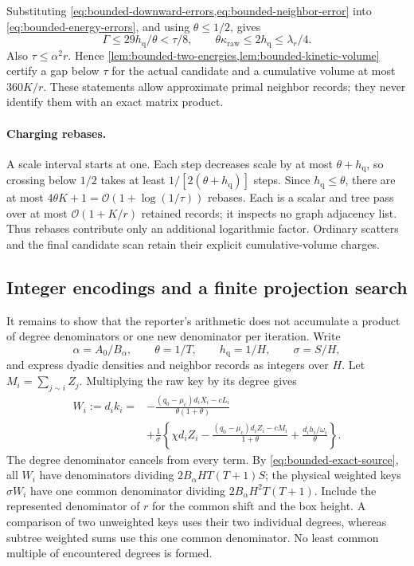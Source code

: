 Substituting \cref{eq:bounded-downward-errors,eq:bounded-neighbor-error}
into \cref{eq:bounded-energy-errors}, and using $\theta\leq1/2$, gives
\begin{equation}
 \Gamma\leq29h_{\mathrm{q}}/\theta<\tau/8,
 \qquad \theta\kappa_{\mathrm{raw}}\leq2h_{\mathrm{q}}\leq\lambda_r/4.
 \label{eq:bounded-certified-budgets}
\end{equation}
Also $\tau\leq\alpha^2r$. Hence
\cref{lem:bounded-two-energies,lem:bounded-kinetic-volume} certify a gap
below $\tau$ for the actual candidate and a cumulative volume at most
$360K/r$. These statements allow approximate primal neighbor records;
they never identify them with an exact matrix product.

\paragraph{Charging rebases.}
A scale interval starts at one. Each step decreases scale by at most
$\theta+h_{\mathrm{q}}$, so crossing below $1/2$ takes at least
$1/[2(\theta+h_{\mathrm{q}})]$ steps. Since $h_{\mathrm{q}}\leq\theta$,
there are at most $4\theta K+1=\mathcal{O}(1+\log(1/\tau))$ rebases.
Each is a scalar and tree pass over at most $\mathcal{O}(1+K/r)$ retained records;
it inspects no graph adjacency list. Thus rebases contribute only an
additional logarithmic factor. Ordinary scatters and the final candidate
scan retain their explicit cumulative-volume charges.

\subsection{Integer encodings and a finite projection search}

It remains to show that the reporter's arithmetic does not accumulate a
product of degree denominators or one new denominator per iteration.
Write
\[
 \alpha=A_0/B_\alpha,\qquad\theta=1/T,\qquad
 h_{\mathrm{q}}=1/H,\qquad\sigma=S/H,
\]
and express dyadic densities and neighbor records as integers over $H$.
Let $M_i=\sum_{j\sim i}Z_j$. Multiplying the raw key by its degree gives
\begin{equation*}
 \begin{aligned}
 W_i:=d_i k_i={}&-
   \frac{(q_0-\mu_{\mathrm{c}})d_iX_i-cL_i}{\theta(1+\theta)}\\
 &+\frac1\sigma\left\{
   \chi d_iZ_i-\frac{(q_0-\mu_{\mathrm{c}})d_iZ_i-cM_i}{1+\theta}
            +\frac{d_i h_i/\omega_i}{\theta}\right\}.
 \end{aligned}
\end{equation*}
The degree denominator cancels from every term. By
\cref{eq:bounded-exact-source}, all $W_i$ have denominators dividing
$2B_\alpha HT(T+1)S$; the physical weighted keys $\sigma W_i$ have
one common denominator dividing $2B_\alpha H^2T(T+1)$.
Include the represented denominator of $r$ for the common shift and the
box height. A comparison of two unweighted keys uses their two individual
degrees, whereas subtree weighted sums use this one common denominator.
No least common multiple of encountered degrees is formed.

